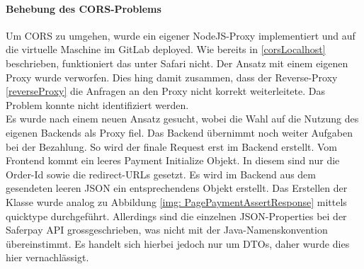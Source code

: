 \paragraph{Behebung des CORS-Problems}\label{behebungCors}
Um CORS zu umgehen, wurde ein eigener NodeJS-Proxy implementiert und auf die virtuelle Maschine im GitLab deployed. Wie bereits in \ref{corsLocalhost} beschrieben, funktioniert das unter Safari nicht. Der Ansatz mit einem eigenen Proxy wurde verworfen. Dies hing damit zusammen, dass der Reverse-Proxy \ref{reverseProxy} die Anfragen an den Proxy nicht korrekt weiterleitete. Das Problem konnte nicht identifiziert werden. \\ Es wurde nach einem neuen Ansatz gesucht, wobei die Wahl auf die Nutzung des eigenen Backends als Proxy fiel. Das Backend übernimmt noch weiter Aufgaben bei der Bezahlung. So wird der finale Request erst im Backend erstellt. Vom Frontend kommt ein leeres Payment Initialize Objekt. In diesem sind nur die Order-Id sowie die redirect-URLs gesetzt. Es wird im Backend aus dem gesendeten leeren JSON ein entsprechendens Objekt erstellt. Das Erstellen der Klasse wurde analog zu Abbildung \ref{img: PagePaymentAssertResponse} mittels quicktype durchgeführt. Allerdings sind die einzelnen JSON-Properties bei der Saferpay API grossgeschrieben, was nicht mit der Java-Namenskonvention übereinstimmt. Es handelt sich hierbei jedoch nur um DTOs, daher wurde dies hier vernachlässigt. 
